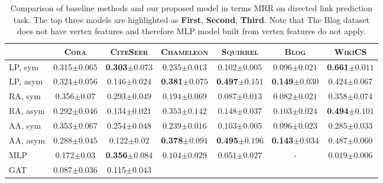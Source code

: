 \documentclass{article}
\newcommand{\firstbest}[1]{\textbf{\textcolor{junscolor1}{#1}}}
\newcommand{\secondbest}[1]{\textbf{\textcolor{junscolor2}{#1}}}
\newcommand{\thirdbest}[1]{\textbf{\textcolor{junscolor3}{#1}}}
\begin{document}
\begin{table}[!t]
\caption{Comparison of baseline methods and our proposed model in terms MRR on directed link prediction task. The top three models are highlighted as \firstbest{First}, \secondbest{Second}, \thirdbest{Third}. Note that The Blog dataset does not have vertex features and therefore MLP model built from vertex features do not apply.}
\centering
\begin{tabular}{l c c c c c c}
& \textsc{Cora}  & \textsc{CiteSeer} & \textsc{Chameleon} & \textsc{Squirrel} & \textsc{Blog} & \textsc{WikiCS} \\ \hline
LP, sym	& 0.315${\scriptstyle\pm0.065}$ & \thirdbest{0.303${\scriptstyle\pm0.073}$} 
&  $0.235{\scriptstyle\pm0.013}$ &  $0.102{\scriptstyle\pm0.005}$ &  $0.096{\scriptstyle\pm0.021}$ &  \secondbest{0.661${\scriptstyle\pm0.011}$} \\
LP, asym	& 0.324${\scriptstyle\pm0.056}$ & 0.146${\scriptstyle\pm0.024}$ 
&  \secondbest{0.381${\scriptstyle\pm0.075}$} &  \secondbest{0.497${\scriptstyle\pm0.151}$} &  \secondbest{0.149${\scriptstyle\pm0.030}$} &  0.424${\scriptstyle\pm0.067}$ \\
RA, sym	& 0.356${\scriptstyle\pm0.07}$ & 0.293${\scriptstyle\pm0.049}$ 
&  $0.194{\scriptstyle\pm0.069}$ &  $0.087{\scriptstyle\pm0.013}$ &  $0.082{\scriptstyle\pm0.021}$ &  $0.358{\scriptstyle\pm0.074}$ \\
RA, asym	& 0.292${\scriptstyle\pm0.046}$ & 0.134${\scriptstyle\pm0.021}$ 
&  $0.353{\scriptstyle\pm0.142}$ &  $0.148{\scriptstyle\pm0.037}$ &  $0.103{\scriptstyle\pm0.024}$ &  \thirdbest{0.494${\scriptstyle\pm0.101}$} \\
AA, sym	& 0.353${\scriptstyle\pm0.067}$ & 0.254${\scriptstyle\pm0.048}$ 
&  $0.239{\scriptstyle\pm0.016}$ &  $0.103{\scriptstyle\pm0.005}$ &  $0.096{\scriptstyle\pm0.023}$ &  $0.285{\scriptstyle\pm0.033}$ \\
AA, asym	& 0.288${\scriptstyle\pm0.045}$ & 0.122${\scriptstyle\pm0.02}$ 
&  \thirdbest{0.378${\scriptstyle\pm0.091}$} &  \thirdbest{0.495${\scriptstyle\pm0.196}$} &  \thirdbest{0.143${\scriptstyle\pm0.034}$} &  $0.487{\scriptstyle\pm0.060}$ \\
\hline
MLP	& 0.172${\scriptstyle\pm0.03}$ & \secondbest{0.356${\scriptstyle\pm0.084}$} 
&  $0.104{\scriptstyle\pm0.029}$ &  $0.051{\scriptstyle\pm0.027}$ &  - &  $0.019{\scriptstyle\pm0.006}$ \\
GAT	& 0.087${\scriptstyle\pm0.036}$ & 0.115${\scriptstyle\pm0.043}$ 

\end{tabular}
\end{table}
\end{document}
